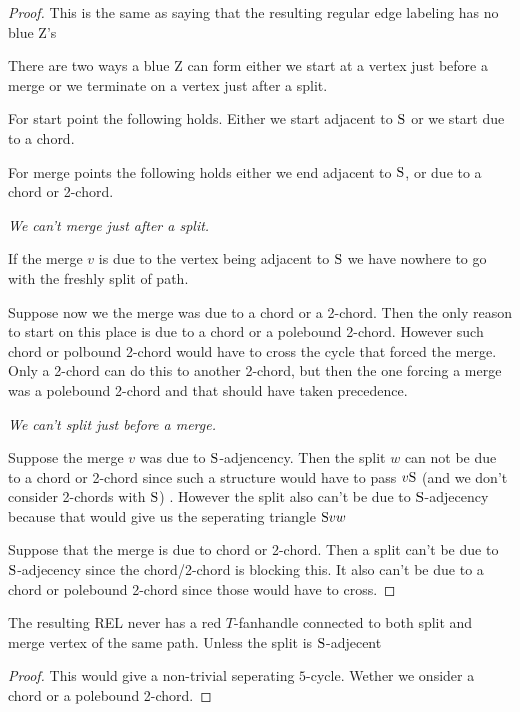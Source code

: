       \begin{proof}
        This is the same as saying that the resulting regular edge labeling has no blue Z's

        There are two ways a blue Z can form either we start at a vertex just before a merge or we terminate on a vertex just after a split.

        For start point the following holds. Either we start adjacent to $\mathrm{S}$ or we start due to a chord.

        For merge points the following holds either we end adjacent to $\mathrm{S}$, or due to a chord or 2-chord.

        \vspace{2ex}
        \emph{We can't merge just after a split.}

        If the merge $v$ is due to the vertex being adjacent to $\mathrm{S}$ we have nowhere to go with the freshly split of path. 

        Suppose now we the merge was due to a chord or a 2-chord. Then the only reason to start on this place is due to a chord or a polebound 2-chord. However such chord or polbound 2-chord would have to cross the cycle that forced the merge. Only a 2-chord can do this to another 2-chord, but then the one forcing a merge was a polebound 2-chord and that should have taken precedence.


        \vspace{2ex}
        \emph{We can't split just before a merge.}

        Suppose the merge $v$ was due to $\mathrm{S}$-adjencency. Then the split $w$ can not be due to a chord or 2-chord since such a structure would have to pass $v \mathrm{S}$ (and we don't consider 2-chords with $\mathrm{S}$) . However the split also can't be due to $\mathrm{S}$-adjecency because that would give us the seperating triangle $\mathrm{S} v w$

        Suppose that the merge is due to chord or 2-chord. Then a split can't be due to $\mathrm{S}$-adjecency since the chord/2-chord is blocking this. It also can't be due to a chord or polebound 2-chord since those would have to cross.

      \end{proof}


      \begin{lemma}
        \label{lm:}
        The resulting REL never has a red $T$-fanhandle connected to both split and merge vertex of the same path. Unless the split is $\mathrm{S}$-adjecent 
      \end{lemma}
      \begin{proof}
          This would give a non-trivial seperating $5$-cycle. Wether we onsider a chord or a polebound 2-chord.
      \end{proof}
